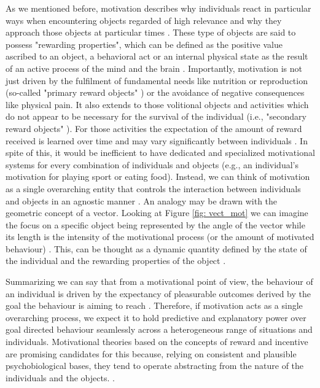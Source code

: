 As we mentioned before, motivation describes why individuals react in particular ways when encountering objects regarded of high relevance and why they approach those objects at particular times \cite{berridge2004motivation}. These type of objects are said to possess "rewarding properties", which can be defined as the positive value ascribed to an object, a behavioral act or an internal physical state as the result of an active process of the mind and the brain \cite{schultz1997neural,berridge2008affective}. Importantly, motivation is not just driven by the fulfilment of fundamental needs like nutrition or reproduction (so-called "primary reward objects" \cite{schultz2000reward}) or the avoidance of negative consequences like physical pain. It also extends to those volitional objects and activities which do not appear to be necessary for the survival of the individual (i.e., "secondary reward objects" \cite{berridge2008affective,sescousse2013processing}). For those activities the expectation of the amount of reward received is learned over time and may vary significantly between individuals \cite{berridge2008affective,simpson2016behavioral}. In spite of this, it would be inefficient to have dedicated and specialized motivational systems for every combination of individuals and objects (e.g., an individual's motivation for playing sport or eating food). Instead, we can think of motivation as a single overarching entity that controls the interaction between individuals and objects in an agnostic manner \cite{simpson2016behavioral}. An analogy may be drawn with the geometric concept of a vector. Looking at Figure \ref{fig: vect_mot} we can imagine the focus on a specific object being represented by the angle of the vector while its length is the intensity of the motivational process (or the amount of motivated behaviour) \cite{simpson2016behavioral}. This, can be thought as a dynamic quantity defined by the state of the individual and the rewarding properties of the object \cite{toates1994comparing,berridge2004motivation,zhang2009neural}.

Summarizing we can say that from a motivational point of view, the behaviour of an individual is driven by the expectancy of pleasurable outcomes derived by the goal the behaviour is aiming to reach \cite{berridge2004motivation}. Therefore, if motivation acts as a single overarching process, we expect it to hold predictive and explanatory power over goal directed behaviour seamlessly across a heterogeneous range of situations and individuals. Motivational theories based on the concepts of reward and incentive are promising candidates for this because, relying on consistent and plausible psychobiological bases, they tend to operate abstracting from the nature of the individuals and the objects. \cite{ikemoto1999role,berridge1998role,salamone2002motivational,berridge2004motivation,armony2013cambridge,corbit2015learning}.

